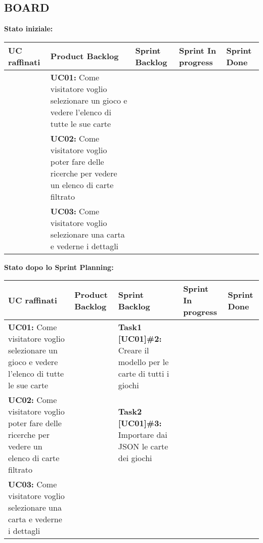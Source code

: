\documentclass{article}
\begin{document}
    \newpage

    \subsection{BOARD}
    \begin{itemize}
        \newline
        \textbf{Stato iniziale:}
        \newline
        \newline
        \begin{tabular}{ | p{2.5cm} | p{4cm} | p{2.6cm} | p{1.6cm} | p{1.6cm} | }
            \hline
            \textbf{UC raffinati}
            & \textbf{Product Backlog}
            & \textbf{Sprint Backlog}
            & \textbf{Sprint In progress}
            & \textbf{Sprint Done} \\
            \hline
            & \textbf{UC01:} Come visitatore voglio selezionare un gioco e vedere l'elenco di tutte le sue carte & & & \\
            \hline
            & \textbf{UC02:} Come visitatore voglio poter fare delle ricerche per vedere un elenco di carte filtrato & & & \\
            \hline
            & \textbf{UC03:} Come visitatore voglio selezionare una carta e vederne i dettagli & & & \\
            \hline
        \end{tabular}
        \newpage
        \textbf{Stato dopo lo Sprint Planning:}
        \newline
        \newline
        \begin{tabular}{ | p{3.5cm} | p{1.5cm} | p{5cm} | p{1.6cm} | p{1.6cm} | }
            \hline
            \textbf{UC raffinati}
            & \textbf{Product Backlog}
            & \textbf{Sprint Backlog}
            & \textbf{Sprint In progress}
            & \textbf{Sprint Done} \\
            \hline
            \textbf{UC01:} Come visitatore voglio selezionare un gioco e vedere l'elenco di tutte le sue carte
            & & \textbf{Task1 [UC01]\#2:} Creare il modello per le carte di tutti i giochi & & \\
            \hline
            \textbf{UC02:} Come visitatore voglio poter fare delle ricerche per vedere un elenco di carte filtrato
            & & \textbf{Task2 [UC01]\#3:} Importare dai JSON le carte dei giochi & & \\
            \hline
            \textbf{UC03:} Come visitatore voglio selezionare una carta e vederne i dettagli

\end{tabular}
\end{itemize}
\end{document}
